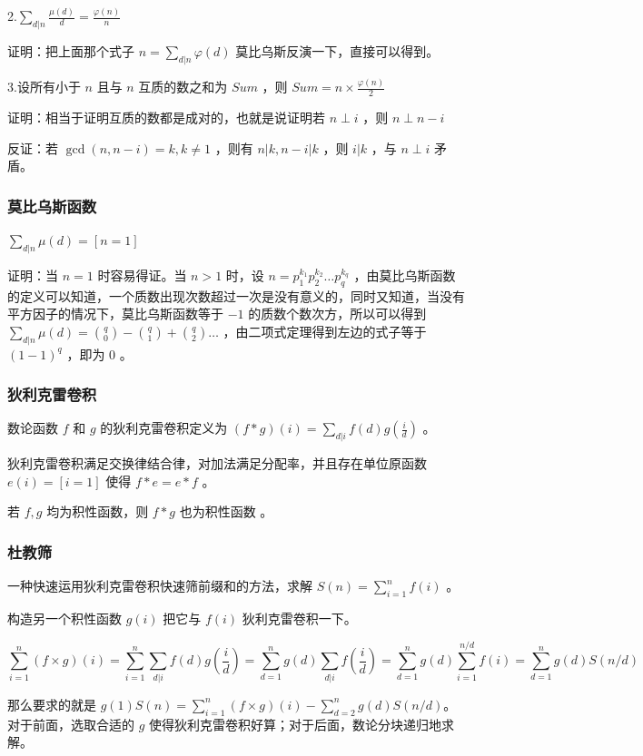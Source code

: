 \documentclass[UTF-8]{ctexart}
\begin{document}
			2.$\sum _ {d|n} \frac{\mu(d)}{d}=\frac{\varphi(n)}{n}$
	
			证明：把上面那个式子 $n=\sum _ {d|n} \varphi(d)$ 莫比乌斯反演一下，直接可以得到。
	
			3.设所有小于 $n$ 且与 $n$ 互质的数之和为 $Sum$ ，则 $Sum=n \times \frac{\varphi(n)}{2}$
	
			证明：相当于证明互质的数都是成对的，也就是说证明若 $n \perp i$ ，则 $n \perp n-i$ 
	 
			反证：若 $\gcd(n,n-i)=k,k \neq 1$ ，则有 $n|k,n-i|k$ ，则 $i|k$ ，与 $n \perp i$ 矛盾。
			\subsubsection{莫比乌斯函数}
			$\sum _ {d|n} \mu(d)=[n=1]$ 
	
			证明：当 $n=1$ 时容易得证。当 $n > 1$ 时，设 $n=p _ 1 ^ {k _ 1} p _ 2 ^ {k _ 2} \dots p _ q ^ {k _ q}$ ，由莫比乌斯函数的定义可以知道，一个质数出现次数超过一次是没有意义的，同时又知道，当没有平方因子的情况下，莫比乌斯函数等于 $-1$ 的质数个数次方，所以可以得到 $\sum _ {d|n} \mu(d)= \binom{q}{0}-\binom{q}{1}+\binom{q}{2} \dots $ ，由二项式定理得到左边的式子等于 $(1-1) ^ q$ ，即为 $0$ 。
			\subsubsection{狄利克雷卷积}
			数论函数 $f$ 和 $g$ 的狄利克雷卷积定义为 $(f * g)(i)=\sum _ {d|i} f(d)g(\frac{i}{d})$ 。
	
			狄利克雷卷积满足交换律结合律，对加法满足分配率，并且存在单位原函数 $e(i)=[i=1]$ 使得 $f * e=e * f$ 。  
	
			若 $f,g$ 均为积性函数，则 $f * g$ 也为积性函数 。
			\subsubsection{杜教筛}
			一种快速运用狄利克雷卷积快速筛前缀和的方法，求解 $S(n)=\sum_{i=1}^n f(i)$ 。
			
			构造另一个积性函数 $g(i)$ 把它与 $f(i)$ 狄利克雷卷积一下。
			
			$$\sum_{i=1}^n (f\times g)(i)=\sum_{i=1}^n \sum_{d|i} f(d)g(\frac{i}{d}) 
			=\sum_{d=1}^n g(d) \sum_{d|i} f(\frac{i}{d}) =\sum_{d=1}^{n} g(d)\sum_{i=1}^{n/d} f(i)=\sum_{d=1}^n g(d)S(n/d)$$
			
			那么要求的就是 $g(1)S(n)=\sum_{i=1}^n (f\times g)(i)-\sum_{d=2}^n g(d)S(n/d)$。对于前面，选取合适的 $g$ 使得狄利克雷卷积好算；对于后面，数论分块递归地求解。
			
\end{document}
